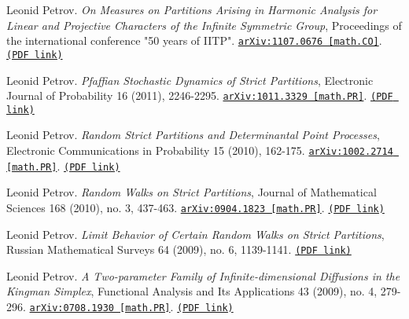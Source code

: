 \documentclass[letterpaper,11pt]{article}
\begin{document}
\begin{etaremune}
\item 
Leonid Petrov.
\emph{On Measures on Partitions Arising in Harmonic Analysis for Linear and Projective Characters of the Infinite Symmetric Group}, Proceedings of the international conference "50 years of IITP". 
\href{https://arxiv.org/abs/1107.0676}{\texttt{arXiv:1107.0676 [math.CO]}}. \href{https://storage.lpetrov.cc/research_files/Petrov-publ/07-publ-petrov.pdf}{\texttt{(PDF link)}}





\item 
Leonid Petrov.
\emph{Pfaffian Stochastic Dynamics of Strict Partitions}, Electronic Journal of Probability 16 (2011), 2246-2295. 
\href{https://arxiv.org/abs/1011.3329}{\texttt{arXiv:1011.3329 [math.PR]}}. \href{https://storage.lpetrov.cc/research_files/Petrov-publ/06-publ-petrov.pdf}{\texttt{(PDF link)}}



\item 
Leonid Petrov.
\emph{Random Strict Partitions and Determinantal Point Processes}, Electronic Communications in Probability 15 (2010), 162-175. 
\href{https://arxiv.org/abs/1002.2714}{\texttt{arXiv:1002.2714 [math.PR]}}. \href{https://storage.lpetrov.cc/research_files/Petrov-publ/05-publ-petrov.pdf}{\texttt{(PDF link)}}







\item 
Leonid Petrov.
\emph{Random Walks on Strict Partitions}, Journal of Mathematical Sciences 168 (2010), no. 3, 437-463. 
\href{https://arxiv.org/abs/0904.1823}{\texttt{arXiv:0904.1823 [math.PR]}}. \href{https://storage.lpetrov.cc/research_files/Petrov-publ/04-publ-petrov.pdf}{\texttt{(PDF link)}}



\item 
Leonid Petrov.
\emph{Limit Behavior of Certain Random Walks on Strict Partitions}, Russian Mathematical Surveys 64 (2009), no. 6, 1139-1141. 
 \href{https://storage.lpetrov.cc/research_files/Petrov-publ/03-publ-petrov.pdf}{\texttt{(PDF link)}}



\item 
Leonid Petrov.
\emph{A Two-parameter Family of Infinite-dimensional Diffusions in the Kingman Simplex}, Functional Analysis and Its Applications 43 (2009), no. 4, 279-296. 
\href{https://arxiv.org/abs/0708.1930}{\texttt{arXiv:0708.1930 [math.PR]}}. \href{https://storage.lpetrov.cc/research_files/Petrov-publ/02-publ-petrov.pdf}{\texttt{(PDF link)}}




\end{etaremune}
\end{document}

